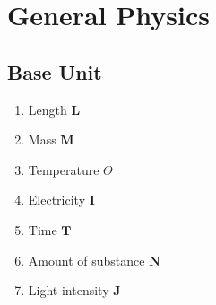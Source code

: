 \chapter{General Physics}

\section{Base Unit}
\begin{enumerate}
    \item Length $\textbf{L}$
    \item Mass  $\textbf{M}$
    \item Temperature $\Theta$
    \item Electricity $\textbf{I}$
    \item Time $\textbf{T}$
    \item Amount of substance $\textbf{N}$
    \item Light intensity $\textbf{J}$
\end{enumerate}